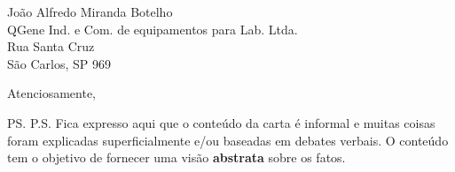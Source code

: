 \documentclass{letter}
\begin{document}
\begin{letter}{João Alfredo Miranda Botelho \\ QGene Ind. e Com. de equipamentos para Lab. Ltda. \\ Rua Santa Cruz \\ São Carlos, SP 969}
\vspace{2\parskip} %
\closing{Atenciosamente,}
\vspace{2\parskip} %

\ps{P.S. Fica expresso aqui que o conteúdo da carta é informal e muitas coisas foram explicadas superficialmente e/ou
baseadas em debates verbais. O conteúdo tem o objetivo de fornecer uma visão \textbf{abstrata} sobre os fatos.
} %



\end{letter}
 
\end{document}
